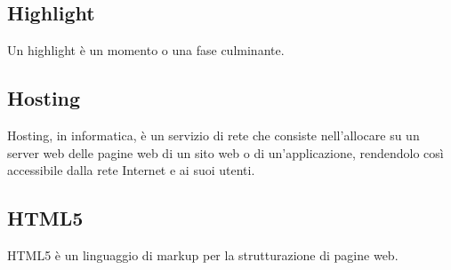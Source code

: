 
\subsection*{Highlight}
Un highlight è un momento o una fase culminante.

\subsection*{Hosting}
Hosting, in informatica, è un servizio di rete che consiste nell'allocare su un server web delle pagine web di un sito web o di un'applicazione, rendendolo così accessibile dalla rete Internet e ai suoi utenti.

\subsection*{HTML5}
HTML5 è un linguaggio di markup per la strutturazione di pagine web.


